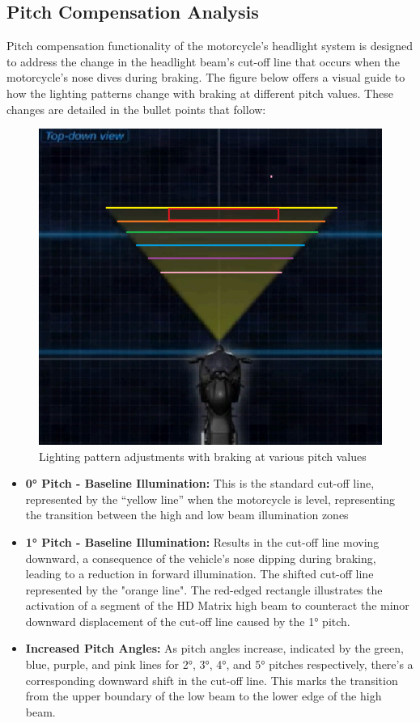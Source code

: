 \subsection{Pitch Compensation Analysis}
Pitch compensation functionality of the motorcycle's headlight system is designed to address the change in the headlight beam's cut-off line that occurs when the motorcycle's nose dives during braking. The figure below offers a visual guide to how the lighting patterns change with braking at different pitch values. These changes are detailed in the bullet points that follow:
\begin{figure}[h!]
    \centering
    \includegraphics[width=0.75\linewidth]{Grafik/Pitch_Analysis_.png}
    \caption{Lighting pattern adjustments with braking at various pitch values}
    \label{pitch}
\end{figure}

\begin{itemize}
\item \textbf{0° Pitch - Baseline Illumination:} This is the standard cut-off line, represented
by the “yellow line” when the motorcycle is level, representing the transition
between the high and low beam illumination zones
\item \textbf{1° Pitch - Baseline Illumination:} Results in the cut-off line moving downward, a consequence of the
vehicle's nose dipping during braking, leading to a reduction in forward
illumination. The shifted cut-off line represented by the "orange line". The
red-edged rectangle illustrates the activation of a segment of the HD Matrix high
beam to counteract the minor downward displacement of the cut-off line caused
by the 1° pitch.
\item \textbf{Increased Pitch Angles:} As pitch angles increase, indicated by the green, blue, purple, and pink lines for 2°, 3°, 4°, and 5° pitches respectively, there's a corresponding downward shift in the cut-off line. This marks the transition from the upper boundary of the low beam to the lower edge of the high beam.
\end{itemize}

